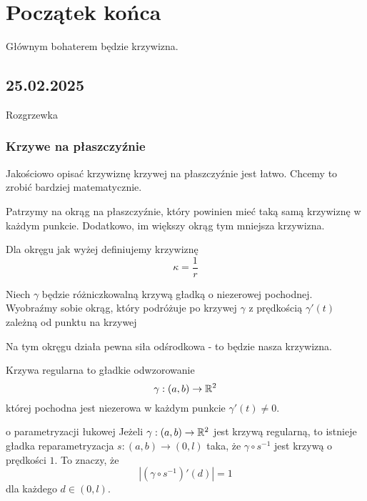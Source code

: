 \chapter{Początek końca}

Głównym bohaterem będzie krzywizna.

\section{25.02.2025}{Rozgrzewka}

\subsection{Krzywe na płaszczyźnie}

Jakościowo opisać krzywiznę krzywej na płaszczyźnie jest łatwo. Chcemy to zrobić bardziej matematycznie. 

Patrzymy na okrąg na płaszczyźnie, który powinien mieć taką samą krzywiznę w każdym punkcie. Dodatkowo, im większy okrąg tym mniejsza krzywizna.
\begin{center}
\end{center}
Dla okręgu jak wyżej definiujemy krzywiznę
$$\kappa=\frac{1}{r}$$

Niech $\gamma$ będzie różniczkowalną krzywą gładką o niezerowej pochodnej. Wyobraźmy sobie okrąg, który podróżuje po krzywej $\gamma$ z prędkością $\gamma'(t)$ zależną od punktu na krzywej
\begin{center}
\end{center}
Na tym okręgu działa pewna siła odśrodkowa - to będzie nasza krzywizna.

\begin{definition}{}{}
  Krzywa regularna to gładkie odwzorowanie
  $$\gamma:(a,b)\to\mathbb{R}^2$$
  której pochodna jest niezerowa w każdym punkcie $\gamma'(t)\neq 0$.
\end{definition}

\begin{lemma}{o parametryzacji łukowej}{}
  Jeżeli $\gamma:(a,b)\to\mathbb{R}^2$ jest krzywą regularną, to istnieje gładka reparametryzacja $s:(a,b)\to(0,l)$ taka, że $\gamma\circ s^{-1}$ jest krzywą o prędkości $1$. To znaczy, że 
  $$|(\gamma\circ s^{-1})'(d)|=1$$
  dla każdego $d\in(0,l)$.
\end{lemma}

